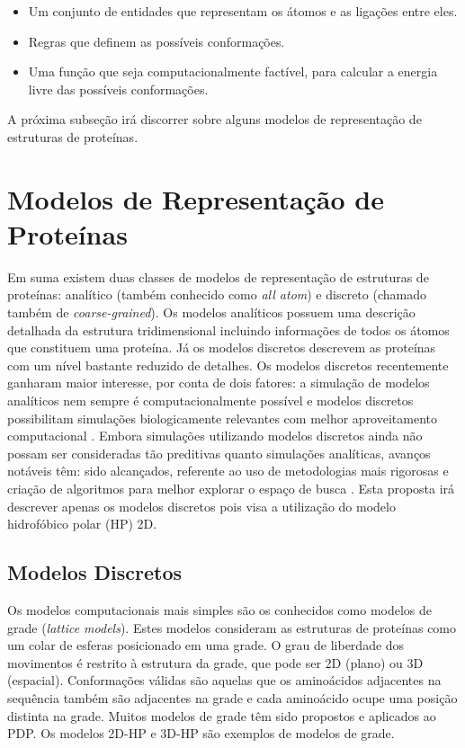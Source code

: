 \begin{itemize}
	\item Um conjunto de entidades que representam os átomos e as ligações entre eles. 
	\item Regras que definem as possíveis conformações.
	\item Uma função que seja computacionalmente factível, para calcular a energia livre das possíveis conformações.
\end{itemize}

A próxima subseção irá discorrer sobre alguns modelos de representação de estruturas de proteínas.

\section{Modelos de Representação de Proteínas}

Em suma existem duas classes de modelos de representação de estruturas de proteínas: analítico (também conhecido como \textit{all atom}) e discreto (chamado também de \textit{coarse-grained}). Os modelos analíticos possuem uma descrição detalhada da estrutura tridimensional incluindo informações de todos os átomos que constituem uma proteína. Já os modelos discretos descrevem as proteínas com um nível bastante reduzido de detalhes. Os modelos discretos recentemente ganharam maior interesse, por conta de dois fatores: a simulação de modelos analíticos nem sempre é computacionalmente possível e modelos discretos possibilitam simulações biologicamente relevantes com melhor aproveitamento  computacional \cite{benitez2015algoritmo}. Embora simulações utilizando modelos discretos ainda não possam ser consideradas tão preditivas quanto simulações analíticas, avanços notáveis têm: sido alcançados, referente ao uso de metodologias mais rigorosas e criação de algoritmos para melhor explorar o espaço de busca \cite{tozzini2005coarse}. Esta proposta irá descrever apenas os modelos discretos pois visa a utilização do modelo hidrofóbico polar (HP) 2D.

\subsection{Modelos Discretos}

Os modelos computacionais mais simples são os conhecidos como modelos de grade (\textit{lattice models}). Estes modelos consideram as estruturas de proteínas como um colar de esferas posicionado em uma grade. O grau de liberdade dos movimentos é restrito à estrutura da grade, que pode ser 2D (plano) ou 3D (espacial). Conformações válidas são aquelas que os aminoácidos adjacentes na sequência também são adjacentes na grade e cada aminoácido ocupe uma posição distinta na grade. Muitos modelos de grade têm sido propostos e aplicados ao PDP. Os modelos 2D-HP e 3D-HP são exemplos de modelos de grade.

